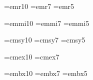 %       

%
%
%
%
%
%
%


\font\tenrm=emr10 %
\font\sevenrm=emr7
\font\fiverm=emr5

\font\teni=emmi10 %
\font\seveni=emmi7
\font\fivei=emmi5

\font\tensy=cmsy10 %
\font\sevensy=cmsy7
\font\fivesy=cmsy5

\font\tenex=cmex10 %
\font\sevenex=cmex7



\font\tenbf=embx10 %
\font\sevenbf=embx7
\font\fivebf=embx5


